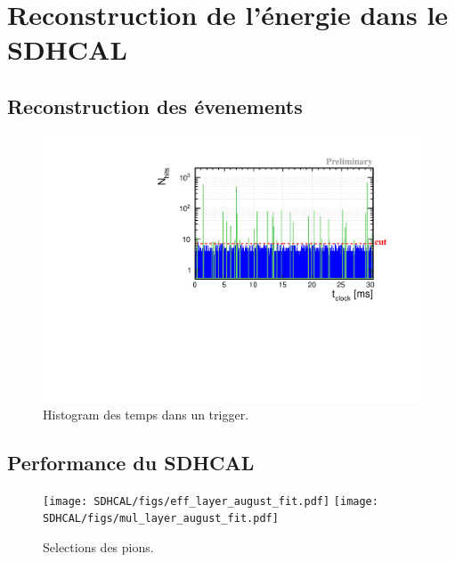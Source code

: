 \section{Reconstruction de l'énergie dans le SDHCAL}

\subsection{Reconstruction des évenements}
\label{sec.trivent}
\begin{figure}[!h]
  \begin{center}
    \includegraphics[width=.8\textwidth]{SDHCAL/figs/time_spectrum.pdf}
    \caption{Histogram des temps dans un trigger.}
    \label{fig:time_spectrum}
  \end{center}
\end{figure}

\subsection{Performance du SDHCAL}
\label{sec.muons}
\begin{figure}[!h]
  \begin{center}
    \texttt{[image: SDHCAL/figs/eff\_layer\_august\_fit.pdf]}
    \texttt{[image: SDHCAL/figs/mul\_layer\_august\_fit.pdf]}
    \caption{Selections des pions.}
    \label{fig:pion_selection}
  \end{center}
\end{figure}


